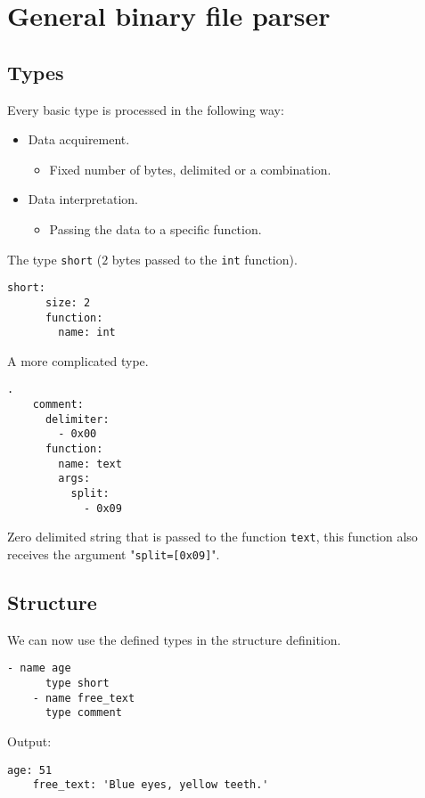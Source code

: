 \documentclass[slidestop]{beamer}
\begin{document}
\section{General binary file parser}
\subsection{Types}
\begin{pframe}
  Every basic type is processed in the following way:
  \begin{itemize}
    \item Data acquirement.
    \begin{itemize}
      \item Fixed number of bytes, delimited or a combination.
    \end{itemize}
    \item Data interpretation.
    \begin{itemize}
      \item Passing the data to a specific function.
    \end{itemize}
  \end{itemize}
  \bigskip

  The type \lstinline{short} ($2$ bytes passed to the \lstinline{int}
  function).
  \begin{lstlisting}[language=none, caption={Simple types definition.}]
    short:
      size: 2
      function:
        name: int
  \end{lstlisting}
\end{pframe}

\begin{pframe}
  A more complicated type.
  \begin{lstlisting}[language=none, caption={Less simple types definition}].
    comment:
      delimiter:
        - 0x00
      function:
        name: text
        args:
          split:
            - 0x09
  \end{lstlisting}

  Zero delimited string that is passed to the function \lstinline{text}, this
  function also receives the argument "\lstinline{split=[0x09]}".
\end{pframe}

\subsection{Structure}
\begin{pframe}
  We can now use the defined types in the structure definition.
  \begin{lstlisting}[language=none, caption={Structure snippet.}]
    - name age
      type short
    - name free_text
      type comment
  \end{lstlisting}

  Output:
  \begin{lstlisting}[language=none, caption={Output snippet.}]
    age: 51
    free_text: 'Blue eyes, yellow teeth.'
  \end{lstlisting}
\end{pframe}
\end{document}
